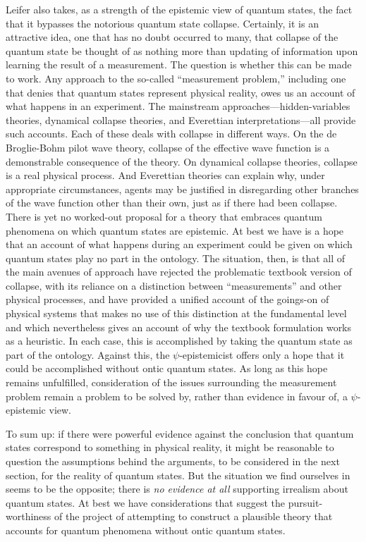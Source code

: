 \documentclass[12pt]{article}
\begin{document}
Leifer also takes, as a strength of the epistemic view of quantum states, the fact that it bypasses the notorious quantum state collapse.  Certainly, it is an attractive idea, one that has no doubt occurred to many, that collapse of the quantum state be thought of as nothing more than updating of information upon learning the result of a measurement.  The question is whether this can be made to work. Any approach to the so-called ``measurement problem,'' including one that denies that quantum states represent physical reality, owes us an account of what happens in an experiment.  The mainstream approaches---hidden-variables theories, dynamical collapse theories, and Everettian interpretations---all provide such accounts. Each of these deals with collapse in different ways. On the de Broglie-Bohm pilot wave theory,  collapse of the effective wave function is a demonstrable consequence of the theory.  On dynamical collapse theories, collapse is a real physical process.  And Everettian theories can explain why, under appropriate circumstances, agents may be justified in disregarding other branches of the wave function other than their own, just as if there had been collapse.   There is yet no worked-out proposal for a theory that embraces quantum phenomena on which quantum states are epistemic. At best we have  is a hope that an account of what happens during an experiment could be given on which quantum states play no part in the ontology.  The situation, then, is that all  of the main avenues of approach have rejected the problematic textbook version of collapse, with its reliance on a distinction between ``measurements'' and other physical processes, and have provided a unified account of the goings-on of physical systems that makes no use of this distinction at the fundamental level and which nevertheless gives an account of why the textbook formulation works as a heuristic. In each case, this is accomplished by taking the quantum state as part of the ontology.   Against this, the $\psi$-epistemicist offers only a hope that it could be accomplished without ontic quantum states.  As long as this hope remains unfulfilled, consideration of the issues surrounding the measurement problem remain a problem to be solved by, rather than evidence in favour of, a $\psi$-epistemic view.

To sum up: if there were powerful evidence against the conclusion that quantum states correspond to something in physical reality, it might be reasonable to question the assumptions behind the arguments, to be considered in the next section, for the reality of quantum states.  But the situation we find ourselves in  seems to be the opposite; there is \emph{no evidence at all} supporting  irrealism about quantum states.  At best we have considerations that suggest the pursuit-worthiness of the project of  attempting to construct a plausible theory that accounts for quantum phenomena without ontic quantum states.
\end{document}
